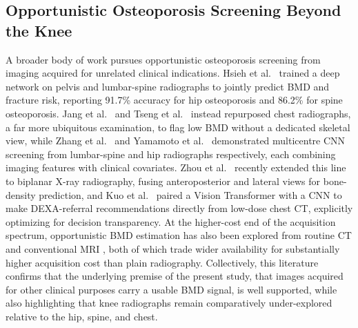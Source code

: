 \documentclass[conference]{IEEEtran}
\begin{document}
\subsection{Opportunistic Osteoporosis Screening Beyond the Knee}
A broader body of work pursues opportunistic osteoporosis screening from imaging acquired for unrelated clinical indications. Hsieh et al.\ \cite{hsieh2021automated} trained a deep network on pelvis and lumbar-spine radiographs to jointly predict BMD and fracture risk, reporting 91.7\% accuracy for hip osteoporosis and 86.2\% for spine osteoporosis. Jang et al.\ \cite{jang2022opportunistic} and Tseng et al.\ \cite{tseng2024clinical} instead repurposed chest radiographs, a far more ubiquitous examination, to flag low BMD without a dedicated skeletal view, while Zhang et al.\ \cite{zhang2020deep} and Yamamoto et al.\ \cite{yamamoto2020deep} demonstrated multicentre CNN screening from lumbar-spine and hip radiographs respectively, each combining imaging features with clinical covariates. Zhou et al.\ \cite{zhou2025novel} recently extended this line to biplanar X-ray radiography, fusing anteroposterior and lateral views for bone-density prediction, and Kuo et al.\ \cite{kuo2025vision} paired a Vision Transformer with a CNN to make DEXA-referral recommendations directly from low-dose chest CT, explicitly optimizing for decision transparency. At the higher-cost end of the acquisition spectrum, opportunistic BMD estimation has also been explored from routine CT \cite{park2024automated, oh2024evaluation} and conventional MRI \cite{galbusera2024estimating}, both of which trade wider availability for substantially higher acquisition cost than plain radiography. Collectively, this literature confirms that the underlying premise of the present study, that images acquired for other clinical purposes carry a usable BMD signal, is well supported, while also highlighting that knee radiographs remain comparatively under-explored relative to the hip, spine, and chest.
\end{document}
